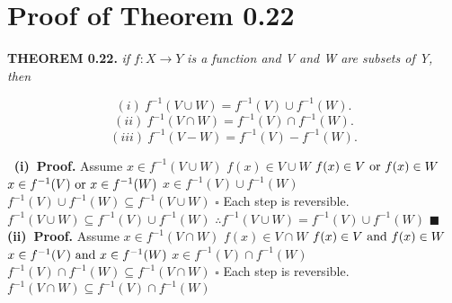 \documentclass[12pt]{article}
\begin{document}
  \section[20pt]{Proof of Theorem 0.22}
	\textbf{THEOREM 0.22. }\textit{if }\(f:X\rightarrow Y\) \textit{ is a function and V and W are subsets of Y, then}
	\begin{adjustwidth}{-2cm}{0cm}
		\begin{flushleft}
		\[(i)\ f^{-1}(V\cup W)=f^{-1}(V)\cup f^{-1}(W).\]
		\[(ii)\ f^{-1}(V\cap W)=f^{-1}(V)\cap f^{-1}(W).\]
		\[(iii)\ f^{-1}(V - W)=f^{-1}(V) - f^{-1}(W).\]
	\end{flushleft}
	\end{adjustwidth}
	\(\ \) \newline
	\textbf{(i)\ Proof.}
	Assume \(x \in f^{-1}(V \cup W)\)
	\newline
	\(f(x) \in V \cup W\)
	\newline
	\(f(x) \in V \textup{ or } f(x) \in W\)
	\newline
	\(x \in f^{-1}(V) \textup{ or } x \in f^{-1}(W)\)
	\newline
	\(x \in f^{-1}(V) \cup f^{-1}(W)\)
	\newline
	\(f^{-1}(V) \cup f^{-1}(W) \subseteq f^{-1}(V \cup W)\)
	\newline \(\square\) \newline
	Each step is reversible.
	\newline
	\(f^{-1}(V \cup W)\subseteq f^{-1}(V) \cup f^{-1}(W)\)
	\newline
	\(\therefore f^{-1}(V\cup W)=f^{-1}(V)\cup f^{-1}(W)\)
	\newline \(\blacksquare\) \newline
	\newline
	\textbf{(ii)\ Proof.}
	Assume \(x \in f^{-1}(V \cap W)\)
	\newline
	\(f(x) \in V \cap W\)
	\newline
	\(f(x) \in V \textup{ and } f(x) \in W\)
	\newline
	\(x \in f^{-1}(V) \textup{ and } x \in f^{-1}(W)\)
	\newline
	\(x \in f^{-1}(V) \cap f^{-1}(W)\)
	\newline
	\(f^{-1}(V) \cap f^{-1}(W) \subseteq f^{-1}(V \cap W)\)
	\newline \(\square\) \newline
	Each step is reversible.
	\newline
	\(f^{-1}(V \cap W)\subseteq f^{-1}(V) \cap f^{-1}(W)\)
	\newline
\end{document}
